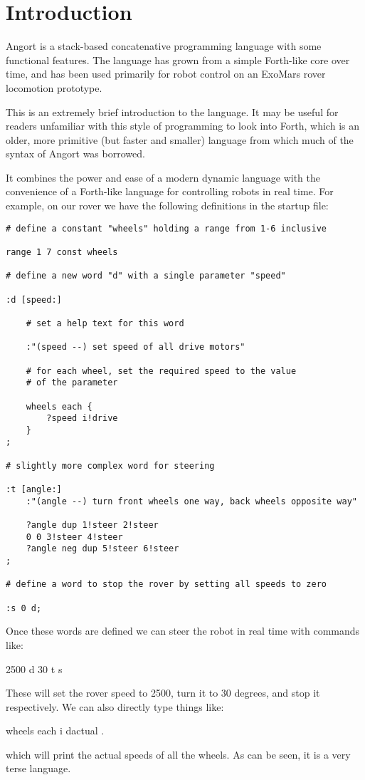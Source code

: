 \section{Introduction}
Angort is a stack-based concatenative programming language with some
functional features. The language has grown from a simple Forth-like
core over time, and has been used primarily for robot control on
an ExoMars rover locomotion prototype.

This is an extremely brief introduction to the language. It may
be useful for readers unfamiliar with this style of programming
to look into Forth, which is an older, more primitive (but faster and
smaller) language from which much of the syntax of Angort was
borrowed.

It combines the power and ease of a modern dynamic language with
the convenience of a Forth-like language for controlling robots in
real time. For example, on our rover we have the following definitions
in the startup file:

\begin{lstlisting}[style=ang]
# define a constant "wheels" holding a range from 1-6 inclusive

range 1 7 const wheels

# define a new word "d" with a single parameter "speed"

:d [speed:]

    # set a help text for this word

    :"(speed --) set speed of all drive motors"
    
    # for each wheel, set the required speed to the value
    # of the parameter
    
    wheels each {
        ?speed i!drive
    }
;

# slightly more complex word for steering

:t [angle:]
    :"(angle --) turn front wheels one way, back wheels opposite way"
    
    ?angle dup 1!steer 2!steer
    0 0 3!steer 4!steer
    ?angle neg dup 5!steer 6!steer
;

# define a word to stop the rover by setting all speeds to zero

:s 0 d;

\end{lstlisting}
Once these words are defined we can steer the robot in real time with
commands like:
\begin{v}
2500 d
30 t
s
\end{v}
These will set the rover speed to 2500, turn it to 30 degrees, and stop
it respectively. We can also directly type things like:
\begin{v}
wheels each { i dactual .}
\end{v}
which will print the actual speeds of all the wheels. As can be seen,
it is a very terse language.

